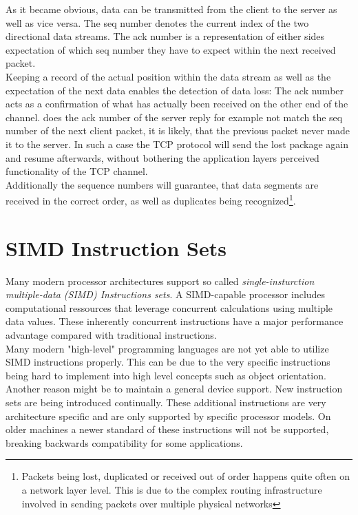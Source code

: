 As it became obvious, data can be transmitted from the client to the server as well as vice versa. The seq number denotes the current index of the two directional data streams. The ack number is a representation of either sides expectation of which seq number they have to expect within the next received packet.\\
Keeping a record of the actual position within the data stream as well as the expectation of the next data enables the detection of data loss: The ack number acts as a confirmation of what has actually been received on the other end of the channel. does the ack number of the server reply for example not match the seq number of the next client packet, it is likely, that the previous packet never made it to the server.  In such a case the TCP protocol will send the lost package again and resume afterwards, without bothering the application layers perceived functionality of the TCP channel.\\
Additionally the sequence numbers will guarantee, that data segments are received in the correct order, as well as duplicates being recognized\footnote{Packets being lost, duplicated or received out of order happens quite often on a network layer level. This is due to the complex routing infrastructure involved in sending packets over multiple  physical networks}.\cite{ComputerNetworks}

\section{SIMD Instruction Sets}
\label{sec:simd}

Many modern processor architectures support so called \textit{single-insturction multiple-data (SIMD) Instructions sets}. A SIMD-capable processor includes computational ressources that leverage concurrent calculations using multiple data values. These inherently concurrent instructions have a major performance advantage compared with traditional instructions.\cite{ModernAssembly}\\
Many modern "high-level" programming languages are not yet able to utilize SIMD instructions properly. This can be due to the very specific instructions being hard to implement into high level concepts such as object orientation. Another reason might be to maintain a general device support. New instruction sets are being introduced continually. These additional instructions are very architecture specific and are only supported by specific processor models. On older machines a newer standard of these instructions will not be supported, breaking backwards compatibility for some applications.\par 

